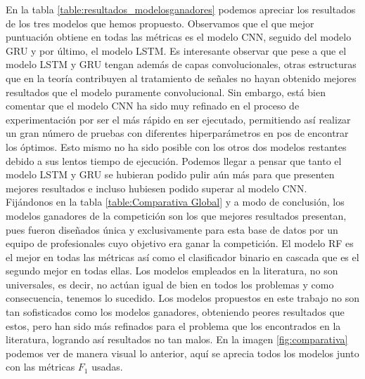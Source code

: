     
    En la tabla \ref{table:resultados_modelosganadores} podemos apreciar los resultados de los tres modelos que hemos propuesto. Observamos que el que mejor puntuación obtiene en todas las métricas es el modelo CNN, seguido del modelo GRU y por último, el modelo LSTM. Es interesante observar que pese a que el modelo LSTM y GRU tengan además de capas convolucionales, otras estructuras que en la teoría contribuyen al tratamiento de señales no hayan obtenido mejores resultados que el modelo puramente convolucional. Sin embargo, está bien comentar que el modelo CNN ha sido muy refinado en el proceso de experimentación por ser el más rápido en ser ejecutado, permitiendo así realizar un gran número de pruebas con diferentes hiperparámetros en pos de encontrar los óptimos. Esto mismo no ha sido posible con los otros dos modelos restantes debido a sus lentos tiempo de ejecución. Podemos llegar a pensar que tanto el modelo LSTM y GRU se hubieran podido pulir aún más para que presenten mejores resultados e incluso hubiesen podido superar al modelo CNN. \\ 
    
    
    Fijándonos en la tabla \ref{table:Comparativa Global} y a modo de conclusión, los modelos ganadores de la competición son los que mejores resultados presentan, pues fueron diseñados única y exclusivamente para esta base de datos por un equipo de profesionales cuyo objetivo era ganar la competición. El modelo RF es el mejor en todas las métricas así como el clasificador binario en cascada que es el segundo mejor en todas ellas. Los modelos empleados en la literatura, no son universales, es decir, no actúan igual de bien en todos los problemas y como consecuencia, tenemos lo sucedido. Los modelos propuestos en este trabajo no son tan sofisticados como los modelos ganadores, obteniendo peores resultados que estos, pero han sido más refinados para el problema que los encontrados en la literatura, logrando así resultados no tan malos. En la imagen \ref{fig:comparativa} podemos ver de manera visual lo anterior, aquí se aprecia todos los modelos junto con las métricas $F_1$ usadas. \\
    
    
    
\endinput